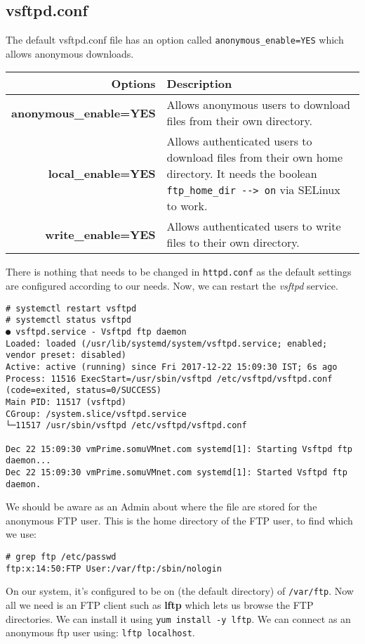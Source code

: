 \subsection{vsftpd.conf}
The default vsftpd.conf file has an option called \verb|anonymous_enable=YES| which allows anonymous downloads. 

\noindent
\begin{tabular}{rM{0.64}}
	\toprule
	\textbf{Options} &\textbf{Description} \\
	\midrule
	\textbf{anonymous\_enable=YES}	&Allows anonymous users to download files from their own directory.\\
	\textbf{local\_enable=YES}	&Allows authenticated users to download files from their own home directory. It needs the boolean \verb|ftp_home_dir --> on| via SELinux to work. \\
	\textbf{write\_enable=YES}	&Allows authenticated users to write files to their own directory.\\
	\bottomrule
\end{tabular}

\noindent
There is nothing that needs to be changed in \verb|httpd.conf| as the default settings are configured according to our needs. Now, we can restart the \textit{vsftpd} service. 

\vspace{-15pt}
\begin{verbatim}	
# systemctl restart vsftpd
# systemctl status vsftpd
● vsftpd.service - Vsftpd ftp daemon
Loaded: loaded (/usr/lib/systemd/system/vsftpd.service; enabled; vendor preset: disabled)
Active: active (running) since Fri 2017-12-22 15:09:30 IST; 6s ago
Process: 11516 ExecStart=/usr/sbin/vsftpd /etc/vsftpd/vsftpd.conf (code=exited, status=0/SUCCESS)
Main PID: 11517 (vsftpd)
CGroup: /system.slice/vsftpd.service
└─11517 /usr/sbin/vsftpd /etc/vsftpd/vsftpd.conf

Dec 22 15:09:30 vmPrime.somuVMnet.com systemd[1]: Starting Vsftpd ftp daemon...
Dec 22 15:09:30 vmPrime.somuVMnet.com systemd[1]: Started Vsftpd ftp daemon.

\end{verbatim}
\vspace{-10pt}

\noindent
We should be aware as an Admin about where the file are stored for the anonymous FTP user. This is the home directory of the FTP user, to find which we use:

\vspace{-15pt}
\begin{verbatim}
# grep ftp /etc/passwd
ftp:x:14:50:FTP User:/var/ftp:/sbin/nologin
\end{verbatim}
\vspace{-10pt}

\noindent
On our system, it's configured to be on (the default directory) of \verb|/var/ftp|. Now all we need is an FTP client such as \textbf{lftp} which lets us browse the FTP directories. We can install it using \verb|yum install -y lftp|. We can connect as an anonymous ftp user using: \verb|lftp localhost|. 